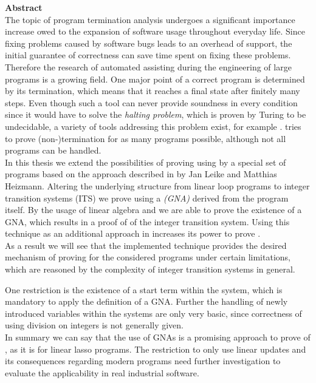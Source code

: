 {\bf\Large Abstract} \\ [1em] 

The topic of program termination analysis undergoes a significant importance increase owed to the expansion of software usage throughout everyday life. Since fixing problems caused by software bugs leads to an overhead of support, the initial guarantee of correctness can save time spent on fixing these problems. Therefore the research of automated assisting during the engineering of large programs is a growing field.
One major point of a correct program is determined by its termination, which means that it reaches a final state after finitely many steps. Even though such a tool can never provide soundness in every condition since it would have to solve the \textit{halting problem}, which is proven by Turing to be undecidable, a variety of tools addressing this problem exist, for example \aprove. \aprove tries to prove (non-)termination for as many programs possible, although not all programs can be handled.\newline \\
In this thesis we extend the possibilities of proving \nonterm using \aprove by a special set of programs based on the approach described in \cite{leike2014geometric} by Jan Leike and Matthias Heizmann. Altering the underlying structure from linear loop programs to integer transition systems (ITS) we prove \nonterm using a \textit{\gna (GNA)} derived from the program itself. By the usage of linear algebra and \solver we are able to prove the existence of a GNA, which results in a proof of \nonterm of the integer transition system. Using this technique as an additional approach in \aprove increases its power to prove \nonterm. 
\\
As a result we will see that the implemented technique provides the desired mechanism of proving \nonterm for the considered programs under certain limitations, which are reasoned by the complexity of integer transition systems in general.

 One restriction is the existence of a start term within the system, which is mandatory to apply the definition of a GNA. Further the handling of newly introduced variables within the systems are only very basic, since correctness of using division on integers is not generally given. \newline
\\
In summary we can say that the use of GNAs is a promising approach to prove \nonterm of \itss, as it is for linear lasso programs. The restriction to only use linear updates and its consequences regarding modern programs need further investigation to evaluate the applicability in real industrial software.
